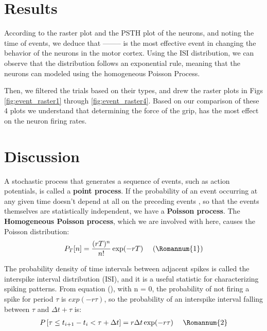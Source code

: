 \documentclass[9pt,twocolumn]{paper-template}
\begin{document}
\section*{Results}
According to the raster plot and the PSTH plot of the neurons, and noting the time of 
events, we deduce that -------- is the most effective event in changing the behavior of the neurons in the motor cortex. Using the ISI distribution, we can observe that the distribution 
follows an exponential rule, meaning that the neurons can modeled using the homogeneous Poisson 
Process.

Then, we filtered the trials based on their types, and drew the raster plots in Figs \ref{fig:event_raster1} through \ref{fig:event_raster4}. Based on our comparison of these 4
plots we understand that determining the force of the grip, has the most effect on the neuron 
firing rates.

\section*{Discussion}
A stochastic process that generates a sequence of events, such as action
potentials, is called a \textbf{point process}. If the probability of an event occurring at any given time doesn't depend at all on the preceding events , so that the events themselves are statistically independent, we have a \textbf{Poisson process}. The \textbf{Homogeneous Poisson process}, which we are involved with here, causes the Poisson distribution:
\begin{gather*}
P_{T}[n]=\frac{(r T)^{n}}{n !} \exp (-r T)\ \ \ \ (\Romannum{1})
\end{gather*}

The probability density of time intervals between adjacent spikes is called the interspike interval distribution (ISI), and it is a useful statistic for characterizing spiking patterns.\cite{principles} From equation (), with n = 0, the probability of not firing a spike for period $ \tau $ is $ exp(-r\tau) $, so the probability of an interspike interval falling
between $ \tau $ and $ \Delta t + \tau $ is:
\begin{gather*}
P\left[\tau \leq t_{i+1}-t_{i}<\tau+\Delta t\right]=r \Delta t \exp (-r \tau)\ \ \ \ \Romannum{2}
\end{gather*}
\end{document}
